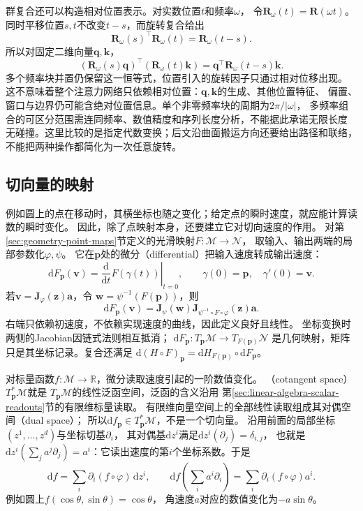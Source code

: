 群复合还可以构造相对位置表示。对实数位置$t$和频率$\omega$，
令$\bm R_\omega(t)=\bm R(\omega t)$。同时平移位置$s,t$不改变$t-s$，而旋转复合给出
\begin{equation}
 \bm R_\omega(s)^\top\bm R_\omega(t)=\bm R_\omega(t-s).
 \label{eq:geometry-rotary-relative-position}
\end{equation}
所以对固定二维向量$\bm q,\bm k$，
\begin{equation}
 (\bm R_\omega(s)\bm q)^\top(\bm R_\omega(t)\bm k)
 =\bm q^\top\bm R_\omega(t-s)\bm k.
 \label{eq:geometry-rotary-dot-product}
\end{equation}
多个频率块并置仍保留这一恒等式，位置引入的旋转因子只通过相对位移出现。
这不意味着整个注意力网络只依赖相对位置：$\bm q,\bm k$的生成、其他位置特征、
偏置、窗口与边界仍可能含绝对位置信息。单个非零频率块的周期为$2\pi/|\omega|$，
多频率组合的可区分范围需连同频率、数值精度和序列长度分析，不能据此承诺无限长度
无碰撞。这里比较的是指定代数变换；后文沿曲面搬运方向还要给出路径和联络，
不能把两种操作都简化为一次任意旋转。


\subsection{切向量的映射}
\label{sec:geometry-tangent-maps}

例如圆上的点在移动时，其横坐标也随之变化；给定点的瞬时速度，就应能计算读数的瞬时变化。
因此，除了点映射本身，还要建立它对切向速度的作用。
对第\ref{sec:geometry-point-maps}节定义的光滑映射$F:\mathcal M\to\mathcal N$，
取输入、输出两端的局部参数化$\varphi,\psi$。
它在$\bm p$处的微分（differential）把输入速度转成输出速度：
\[
 \mathrm dF_{\bm p}(\bm v)
 =\left.\frac{\mathrm d}{\mathrm dt}F(\gamma(t))\right|_{t=0},
 \qquad\gamma(0)=\bm p,\quad\gamma'(0)=\bm v.
\]
若$\bm v=\bm J_\varphi(\bm z)\bm a$，令
$\bm w=\psi^{-1}(F(\bm p))$，则
\begin{equation}
 \mathrm dF_{\bm p}(\bm v)
 =\bm J_\psi(\bm w)
   \bm J_{\psi^{-1}\circ F\circ\varphi}(\bm z)\bm a.
 \label{eq:geometry-map-differential}
\end{equation}
右端只依赖初速度，不依赖实现速度的曲线，因此定义良好且线性。
坐标变换时两侧的Jacobian因链式法则相互抵消；
$\mathrm dF_{\bm p}:T_{\bm p}\mathcal M\to T_{F(\bm p)}\mathcal N$
是几何映射，矩阵只是其坐标记录。复合还满足
$\mathrm d(H\circ F)_{\bm p}=\mathrm dH_{F(\bm p)}\circ\mathrm dF_{\bm p}$。

对标量函数$f:\mathcal M\to\mathbb R$，微分读取速度引起的一阶数值变化。
（cotangent space）$T_{\bm p}^*\mathcal M$就是
$T_{\bm p}\mathcal M$的线性泛函空间，泛函的含义沿用
第\ref{sec:linear-algebra-scalar-readouts}节的有限维标量读取。
有限维向量空间上的全部线性读取组成其对偶空间（dual space）；
所以$\mathrm df_{\bm p}\in T_{\bm p}^*\mathcal M$，不是一个切向量。
沿用前面的局部坐标$(z^1,\ldots,z^d)$与坐标切基$\partial_i$，
其对偶基$\mathrm dz^i$满足$\mathrm dz^i(\partial_j)=\delta_{i,j}$，
也就是$\mathrm dz^i(\sum_j a^j\partial_j)=a^i$：它读出速度的第$i$个坐标系数。于是
\[
 \mathrm df=\sum_i\partial_i(f\circ\varphi)\,\mathrm dz^i,\qquad
 \mathrm df\!\left(\sum_i a^i\partial_i\right)
 =\sum_i\partial_i(f\circ\varphi)a^i.
\]
例如圆上$f(\cos\theta,\sin\theta)=\cos\theta$，
角速度$a$对应的数值变化为$-a\sin\theta$。

